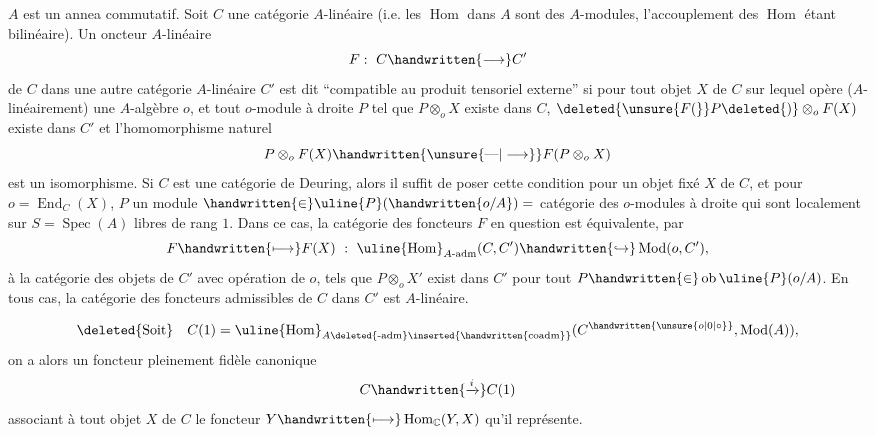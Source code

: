 $A$ est un annea commutatif. Soit $C$ une catégorie $A$-linéaire (i.e. les $\operatorname{Hom}$ dans $A$ sont des $A$-modules, l'accouplement des $\operatorname{Hom}$ étant bilinéaire). Un oncteur $A$-linéaire
\[
F:\ C\handwritten{\longrightarrow}C'
\]
de $C$ dans une autre catégorie $A$-linéaire $C'$ est dit  ``compatible au produit tensoriel externe'' si pour tout objet $X$ de $C$ sur lequel opère ($A$-linéairement) une $A$-algèbre $o$, et tout $o$-module à droite $P$ tel que $P\otimes_o X$ existe dans $C$, $\deleted{\unsure{F(}}P\deleted{)}\otimes_o F(X)$ existe dans $C'$ et l'homomorphisme naturel
\[
P\otimes_o F(X)\handwritten{\unsure{\text{---}|\longrightarrow}}F(P\otimes_o X)
\]
est un isomorphisme. Si $C$ est une catégorie de Deuring, alors il suffit de poser cette condition pour un objet fixé $X$ de $C$, et pour $o=\operatorname{End}_C(X)$, $P$ un module $\handwritten{\in}\uline{P}(\handwritten{o/A})=$ catégorie des $o$-modules à droite qui sont localement sur $S=\operatorname{Spec}(A)$ libres de rang $1$. Dans ce cas, la catégorie des foncteurs $F$ en question est équivalente, par
\[
F\handwritten{\longmapsto}F(X)\ :\ \uline{\operatorname{Hom}}_{A\text{-}\mathrm{adm}}(C,C')\handwritten{\hookrightarrow}\operatorname{Mod}(o,C'),
\]
à la catégorie des objets  de $C'$ avec opération de $o$, tels que $P\otimes_o X'$ exist dans $C'$ pour tout $P\handwritten{\in}\operatorname{ob}\uline{P}(o/A)$. En tous cas, la catégorie des foncteurs admissibles de $C$ dans $C'$ est $A$-linéaire.

\[
\deleted{\text{Soit}}\quad C(1)=\uline{\operatorname{Hom}}_{A\deleted{\text{-}\mathrm{adm}}\inserted{\handwritten{\mathrm{coadm}}}}(C^{\handwritten{\unsure{o|0|\circ}}},\operatorname{Mod}(A)),
\]
on a alors un foncteur pleinement fidèle canonique
\[
C\handwritten{\xrightarrow{i}}C(1)
\]
associant à tout objet $X$ de $C$ le foncteur $Y\handwritten{\longmapsto}\operatorname{Hom}_{\mathbb{C}}(Y,X)$ qu'il représente. 


